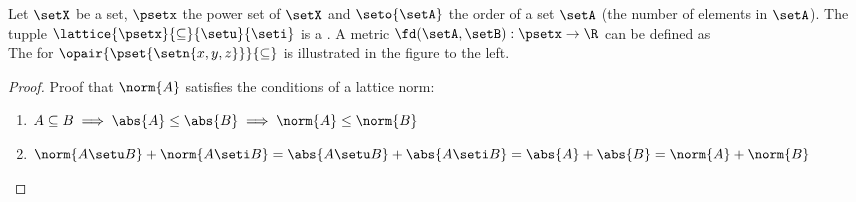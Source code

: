 \hfill%
%  
\begin{minipage}{\tw-43mm}\raggedright
\begin{example}
\label{ex:norm_d_powerset}
  Let $\setX$ be a set, $\psetx$ the power set of $\setX$
  and $\seto{\setA}$ the order of a set $\setA$ (the number of elements in $\setA$).
  The tupple $\lattice{\psetx}{\subseteq}{\setu}{\seti}$ is a .\footnotemark
  A metric $\fd(\setA,\setB):\psetx\to\R$ can be defined as
  \\
  The  for $\opair{\pset{\setn{x,y,z}}}{\subseteq}$
  is illustrated in the figure to the left.
\end{example}
\end{minipage}
\begin{proof}
  Proof that $\norm{A}$ satisfies the conditions of a lattice norm:
      \begin{enumerate}
        \item $A\subseteq B \implies \abs{A}\le\abs{B} \implies \norm{A}\le\norm{B}$
        \item $\norm{A\setu B} + \norm{A\seti B} = \abs{A\setu B} + \abs{A\seti B}
              = \abs{A} + \abs{B} = \norm{A} + \norm{B}$
      \end{enumerate}
\end{proof}

